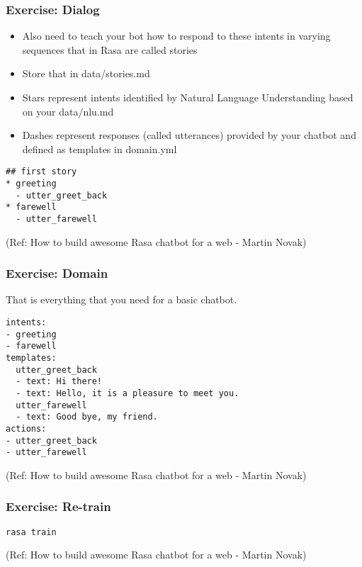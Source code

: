  \begin{frame}[fragile]\frametitle{Exercise: Dialog}

\begin{itemize}
\item Also need to teach your bot how to respond to these intents in varying sequences that in Rasa are called stories
\item Store that in data/stories.md
\item Stars represent intents identified by Natural Language Understanding based on your data/nlu.md 
\item Dashes represent responses (called utterances) provided by your chatbot and defined as templates in domain.yml
\end{itemize}


\begin{lstlisting}
## first story
* greeting
  - utter_greet_back
* farewell
  - utter_farewell
\end{lstlisting}


{\tiny (Ref: How to build awesome Rasa chatbot for a web - Martin Novak)}

\end{frame}

 \begin{frame}[fragile]\frametitle{Exercise: Domain}

That is everything that you need for a basic chatbot.

\begin{lstlisting}
intents:
- greeting
- farewell
templates:
  utter_greet_back
  - text: Hi there!
  - text: Hello, it is a pleasure to meet you.
  utter_farewell
  - text: Good bye, my friend.
actions:
- utter_greet_back
- utter_farewell
\end{lstlisting}


{\tiny (Ref: How to build awesome Rasa chatbot for a web - Martin Novak)}

\end{frame}

 \begin{frame}[fragile]\frametitle{Exercise: Re-train}

\begin{lstlisting}
rasa train
\end{lstlisting}


{\tiny (Ref: How to build awesome Rasa chatbot for a web - Martin Novak)}

\end{frame}

